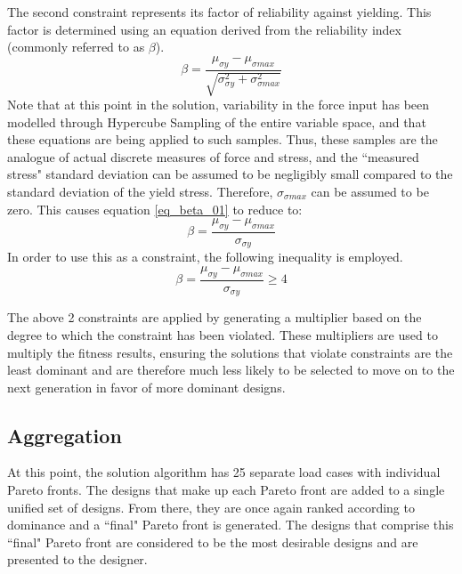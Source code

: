 The second constraint represents its factor of reliability against yielding. This factor is determined using an equation derived from the reliability index (commonly referred to as $\beta$).
\begin{equation}\label{eq_beta_01}
\beta = \frac{\mu_{\sigma y} - \mu_{\sigma max}}{\sqrt{\sigma_{\sigma y}^2 + \sigma_{\sigma max}^2}}
\end{equation}
Note that at this point in the solution, variability in the force input has been modelled through Hypercube Sampling of the entire variable space, and that these equations are being applied to such samples. Thus, these samples are the analogue of actual discrete measures of force and stress, and the ``measured stress" standard deviation can be assumed to be negligibly small compared to the standard deviation of the yield stress. Therefore, $\sigma_{\sigma max}$ can be assumed to be zero. This causes equation \ref{eq_beta_01} to reduce to: 
\begin{equation}
\beta = \frac{\mu_{\sigma y} - \mu_{\sigma max}}{\sigma_{\sigma y}}
\end{equation}
In order to use this as a constraint, the following inequality is employed. 
\begin{equation}
\beta = \frac{\mu_{\sigma y} - \mu_{\sigma max}}{\sigma_{\sigma y}} \geq 4
\end{equation}

The above 2 constraints are applied by generating a multiplier based on the degree to which the constraint has been violated. These multipliers are used to multiply the fitness results, ensuring the solutions that violate constraints are the least dominant and are therefore much less likely to be selected to move on to the next generation in favor of more dominant designs. 

\subsection{Aggregation}
At this point, the solution algorithm has 25 separate load cases with individual Pareto fronts. The designs that make up each Pareto front are added to a single unified set of designs. From there, they are once again ranked according to dominance and a ``final" Pareto front is generated. The designs that comprise this ``final" Pareto front are considered to be the most desirable designs and are presented to the designer. 